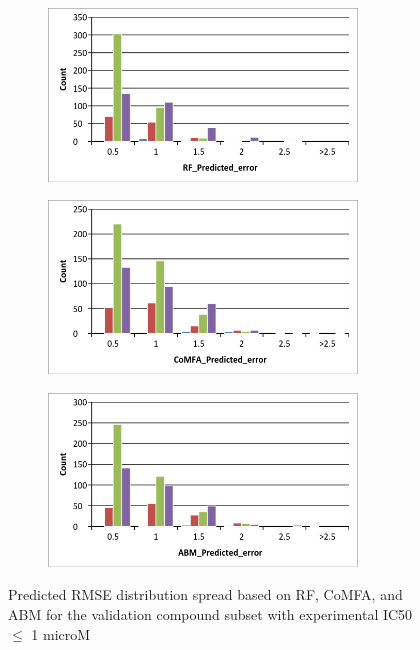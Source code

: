 \begin{figure}
\centering
\begin{subfigure}
  \centering
  \includegraphics[width=0.9\textwidth]{Images/bace_fig5A.png}
  \label{fig:bace_5A}
\end{subfigure}
\begin{subfigure}
  \centering
  \includegraphics[width=0.9\textwidth]{Images/bace_fig5B.png}
  \label{fig:bace_5B}
\end{subfigure}
\begin{subfigure}
  \centering
  \includegraphics[width=0.9\textwidth]{Images/bace_fig5C.png}
  \label{fig:bace_5C}
\end{subfigure}
\caption{Predicted RMSE distribution spread based on RF, CoMFA, and ABM for the validation compound subset with experimental IC50 $\leq$ 1 microM}
\label{fig:bace_5}
\end{figure}

